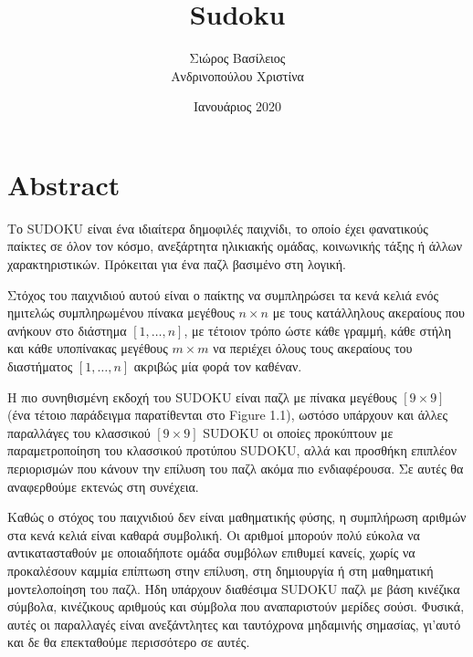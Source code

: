 \documentclass[12pt]{book}
\title{\huge Sudoku}
\author{Σιώρος Βασίλειος\\Ανδρινοπούλου Χριστίνα}
\date{Ιανουάριος 2020}
\theoremstyle{definition}
\begin{document}
\maketitle

\pagebreak

\tableofcontents

\chapter{Abstract}

Το SUDOKU είναι ένα ιδιαίτερα δημοφιλές παιχνίδι, το οποίο έχει φανατικούς παίκτες σε όλον τον κόσμο, ανεξάρτητα ηλικιακής ομάδας, κοινωνικής τάξης ή άλλων χαρακτηριστικών. Πρόκειται για ένα παζλ βασιμένο στη λογική. \par

Στόχος του παιχνιδιού αυτού είναι ο παίκτης να συμπληρώσει τα
κενά κελιά ενός ημιτελώς συμπληρωμένου πίνακα μεγέθους
\(n \times n\) με τους κατάλληλους ακεραίους που ανήκουν στο διάστημα \(\left[1,\dots,n \right]\), με τέτοιον τρόπο ώστε κάθε γραμμή, κάθε στήλη και κάθε υποπίνακας μεγέθους \(m \times m\) να περιέχει όλους τους ακεραίους του διαστήματος  \(\left[1,\dots,n \right]\) ακριβώς μία φορά τον καθέναν. \par

Η πιο συνηθισμένη εκδοχή του SUDOKU είναι παζλ με πίνακα μεγέθους \(\left[9 \times 9\right]\) (ένα τέτοιο παράδειγμα παρατίθενται στο Figure 1.1), ωστόσο υπάρχουν και άλλες παραλλάγες του κλασσικού \(\left[9 \times 9\right] \) SUDOKU οι οποίες προκύπτουν με παραμετροποίηση του κλασσικού προτύπου SUDOKU, αλλά και προσθήκη επιπλέον περιορισμών που κάνουν την επίλυση του παζλ ακόμα πιο ενδιαφέρουσα. Σε αυτές θα αναφερθούμε εκτενώς στη συνέχεια. \par

Καθώς ο στόχος του παιχνιδιού δεν είναι μαθηματικής φύσης, η συμπλήρωση αριθμών στα κενά κελιά είναι καθαρά συμβολική. Οι αριθμοί μπορούν πολύ εύκολα να αντικατασταθούν με οποιαδήποτε ομάδα συμβόλων επιθυμεί κανείς, χωρίς να προκαλέσουν καμμία επίπτωση στην επίλυση, στη δημιουργία ή στη μαθηματική μοντελοποίηση του παζλ. Ήδη υπάρχουν διαθέσιμα SUDOKU παζλ με βάση κινέζικα σύμβολα, κινέζικους αριθμούς και σύμβολα που αναπαριστούν μερίδες σούσι. Φυσικά, αυτές οι παραλλαγές είναι ανεξάντλητες και ταυτόχρονα μηδαμινής σημασίας, γι'αυτό και δε θα επεκταθούμε περισσότερο σε αυτές. 
\end{document}
